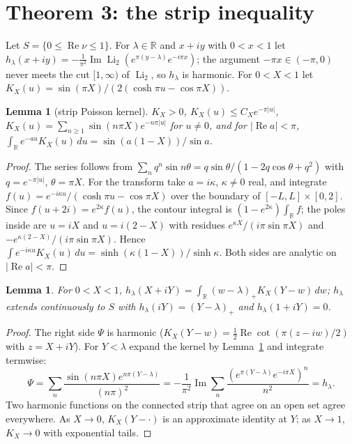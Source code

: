 \documentclass[11pt]{amsart}
\newtheorem{lemma}[theorem]{Lemma}
\theoremstyle{definition}
\theoremstyle{remark}
\numberwithin{equation}{section}
\newcommand{\R}{\mathbb{R}}
\newcommand{\Li}{\operatorname{Li}_2}
\renewcommand{\Re}{\operatorname{Re}}
\renewcommand{\Im}{\operatorname{Im}}
\begin{document}
\section{Theorem 3: the strip inequality}\label{sec:strip}

Let $S=\{0\le\Re\nu\le1\}$. For $\lambda\in\R$ and $x+iy$ with $0<x<1$ let
$h_\lambda(x+iy)=-\frac1{\pi^2}\Im\Li(e^{\pi(y-\lambda)}e^{-i\pi x})$; the argument $-\pi x\in(-\pi,0)$ never meets the
cut $[1,\infty)$ of $\Li$, so $h_\lambda$ is harmonic. For $0<X<1$ let $K_X(u)=\sin(\pi X)/(2(\cosh\pi u-\cos\pi X))$.

\begin{lemma}[strip Poisson kernel]\label{lem:kernel}
$K_X>0$, $K_X(u)\le C_Xe^{-\pi|u|}$, $K_X(u)=\sum_{n\ge1}\sin(n\pi X)e^{-n\pi|u|}$ for $u\ne0$, and for $|\Re a|<\pi$,
$\int_\R e^{-au}K_X(u)\,du=\sin(a(1-X))/\sin a$.
\end{lemma}

\begin{proof}
The series follows from $\sum_nq^n\sin n\theta=q\sin\theta/(1-2q\cos\theta+q^2)$ with $q=e^{-\pi|u|}$,
$\theta=\pi X$. For the transform take $a=i\kappa$, $\kappa\ne0$ real, and integrate
$f(u)=e^{-i\kappa u}/(\cosh\pi u-\cos\pi X)$ over the boundary of $[-L,L]\times[0,2]$. Since $f(u+2i)=e^{2\kappa}f(u)$,
the contour integral is $(1-e^{2\kappa})\int_\R f$; the poles inside are $u=iX$ and $u=i(2-X)$ with residues
$e^{\kappa X}/(i\pi\sin\pi X)$ and $-e^{\kappa(2-X)}/(i\pi\sin\pi X)$. Hence
$\int e^{-i\kappa u}K_X(u)\,du=\sinh(\kappa(1-X))/\sinh\kappa$. Both sides are analytic on $|\Re a|<\pi$.
\end{proof}

\begin{lemma}\label{lem:poisson}
For $0<X<1$, $h_\lambda(X+iY)=\int_\R(w-\lambda)_+K_X(Y-w)\,dw$; $h_\lambda$ extends continuously to $S$ with
$h_\lambda(iY)=(Y-\lambda)_+$ and $h_\lambda(1+iY)=0$.
\end{lemma}

\begin{proof}
The right side $\Psi$ is harmonic ($K_X(Y-w)=\frac12\Re\cot(\pi(z-iw)/2)$ with $z=X+iY$). For $Y<\lambda$ expand the
kernel by Lemma~\ref{lem:kernel} and integrate termwise:
\[
\Psi=\sum_n\frac{\sin(n\pi X)e^{n\pi(Y-\lambda)}}{(n\pi)^2}=-\frac1{\pi^2}\Im\sum_n\frac{(e^{\pi(Y-\lambda)}e^{-i\pi X})^n}{n^2}=h_\lambda .
\]
Two harmonic functions on the connected strip that agree on an open set agree everywhere. As $X\to0$, $K_X(Y-\cdot)$
is an approximate identity at $Y$; as $X\to1$, $K_X\to0$ with exponential tails.
\end{proof}
\end{document}
